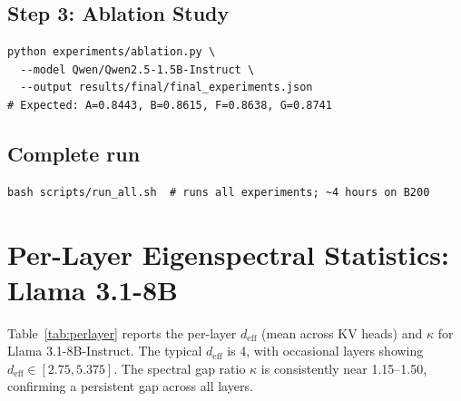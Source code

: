 \documentclass[11pt]{article}
\newcommand{\deff}{d_{\mathrm{eff}}}
\begin{document}
\subsection*{Step 3: Ablation Study}

\begin{verbatim}
python experiments/ablation.py \
  --model Qwen/Qwen2.5-1.5B-Instruct \
  --output results/final/final_experiments.json
# Expected: A=0.8443, B=0.8615, F=0.8638, G=0.8741
\end{verbatim}

\subsection*{Complete run}

\begin{verbatim}
bash scripts/run_all.sh  # runs all experiments; ~4 hours on B200
\end{verbatim}

\section{Per-Layer Eigenspectral Statistics: Llama 3.1-8B}
\label{app:perlayer}

Table~\ref{tab:perlayer} reports the per-layer $\deff$ (mean across KV heads)
and $\kappa$ for Llama 3.1-8B-Instruct.  The typical $\deff$ is 4, with
occasional layers showing $\deff \in [2.75, 5.375]$.  The spectral gap ratio
$\kappa$ is consistently near 1.15--1.50, confirming a persistent gap across
all layers.
\end{document}
